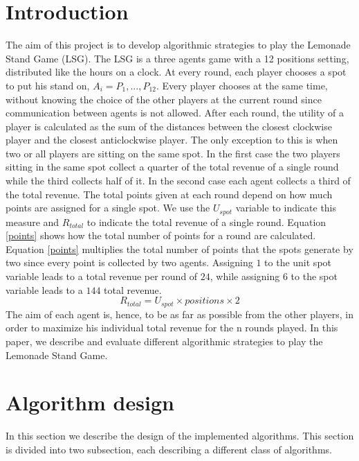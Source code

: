 \documentclass[runningheads]{llncs}
\begin{document}
\section{Introduction}
The aim of this project is to develop algorithmic strategies to play
the Lemonade Stand Game (LSG). The LSG is a three agents game with a
12 positions setting, distributed like the hours on a clock.  At every
round, each player chooses a spot to put his stand on, $A_i = {P_1, ...,
  P_{12}}$. Every player chooses at the same time, without knowing the
choice of the other players at the current round since communication
between agents is not allowed. After each round, the utility of a
player is calculated as the sum of the distances between the closest
clockwise player and the closest anticlockwise player. The only
exception to this is when two or all players are sitting on the same
spot. In the first case the two players sitting in the same spot
collect a quarter of the total revenue of a single round while the
third collects half of it. In the second case each agent collects a
third of the total revenue. The total points given at each round depend
on how much points are assigned for a single spot. We use the 
$U_{spot}$ variable to indicate this measure and $R_{total}$ to
indicate the total revenue of a single round. Equation \ref{points} shows
how the total number of points for a round are calculated.
Equation \ref{points} multiplies the total number of points that the
spots generate by two since every point is collected by two
agents. Assigning $1$ to the unit spot variable leads to a total
revenue per round of $24$, while assigning $6$ to the spot variable
leads to a $144$ total revenue.
\begin{equation}\label{points}
R_{total} = U_{spot} \times positions \times 2
\end{equation}
The aim of each agent is, hence, to be as far as possible from the
other players, in order to maximize his individual total revenue for the n rounds
played. In this paper, we describe and evaluate different algorithmic
strategies to play the Lemonade Stand Game.

\section{Algorithm design}
In this section we describe the design of the implemented
algorithms. This section is divided into two subsection, each
describing a different class of algorithms. 
\end{document}

